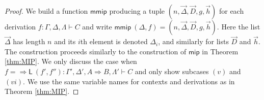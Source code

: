 \documentclass[a4paper,UKenglish,cleveref,autoref,thm-restate, anonymous]{lipics-v2021}
\renewcommand{\vec}[1]{\overrightarrow{#1}}
\newcommand{\Rarr}{\Rightarrow}
\newcommand{\mf}[1]{\mathsf{#1}}
\newcommand{\GG}{\Gamma}
\newcommand{\GD}{\Delta}
\newcommand{\GL}{\Lambda}
\newcommand{\vd}{\vdash}
\newcommand{\Rl}{{\Rarr}\mathsf{L}}
\begin{document}
\begin{proof}
  We build a function $\mf{mmip}$ producing a tuple $(n,\vec{\GD},\vec{D},g,\vec{h})$ for each derivation $f : \Gamma,\Delta,\Lambda \vdash C$ and write $\mf{mmip}\ (\GD,f) = (n,\vec{\GD},\vec{D},g,\vec{h})$. Here the list $\vec{\GD}$ has length $n$ and its $i$th element is denoted $\GD_i$, and similarly for lists $\vec{D}$ and $\vec{h}$.
  The construction proceeds similarly to the construction of $\mf{mip}$ in Theorem \ref{thm:MIP}.
  We only discuss the case when $f = \Rl \ (f' , f'') : \GG' , \GD' , A \Rarr B , \GL' \vd C$ and only show subcases $(v)$ and $(vi)$. We use the same variable names for contexts and derivations as in Theorem \ref{thm:MIP}.


\end{proof}
\end{document}
